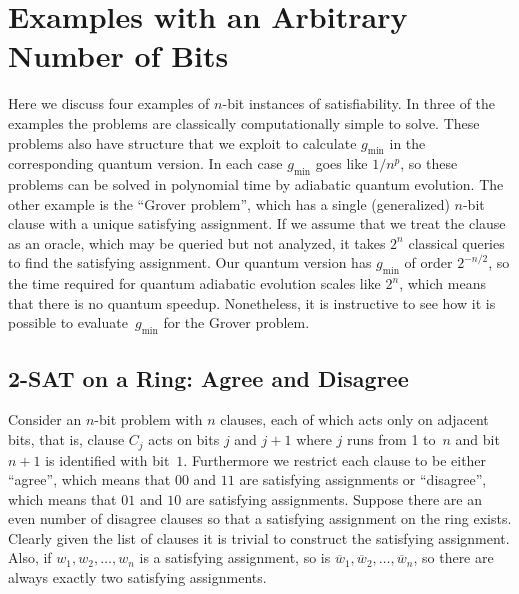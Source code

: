 \documentclass[twoside]{article}
\newcommand{\citeRef}[1]{\thinspace\cite{ref:#1}}
\newcommand{\gm}{g_{\min}}
\let\bar\overline
\numberwithin{equation}{section}
\begin{document}
\section{Examples with an Arbitrary Number of Bits}\label{sec:3}
\setcounter{equation}{0}

Here we discuss four examples  of $n$-bit instances of satisfiability. In three
of the examples the problems are classically computationally simple to solve.
These problems also have  structure that we exploit to calculate $\gm$ in
the corresponding quantum version. In each case $\gm$ goes like $1/n^p$,
so these problems can be solved in polynomial time by adiabatic quantum
evolution. The other example is the ``Grover problem''\citeRef1, which has a
single (generalized)
$n$-bit clause with a unique satisfying assignment. If we assume that we
treat the clause as an oracle, which may be queried but not analyzed, it
takes $2^n$ classical queries to find the satisfying assignment. Our
quantum version has $\gm$ of order $2^{-n/2}$, so the time required for
quantum adiabatic evolution scales like $2^n$, which means that there is
no quantum speedup.  Nonetheless, it is instructive to see how it is possible
to evaluate~$\gm$ for the Grover problem.  

\subsection{2-SAT on a Ring: Agree and Disagree}\label{sec:3.1}
\label{sec:ring} Consider an $n$-bit problem with $n$ clauses, each of
which acts only on adjacent bits,  that is, clause $C_j$ acts on bits $j$ and
$j+1$ where $j$ runs from 1 to~$n$ and bit $n+1$ is identified with
bit~$1$.  Furthermore we restrict each clause to be either ``agree'',  which
means that $00$ and $11$ are satisfying assignments or ``disagree'', which
means that
$01$ and $10$ are satisfying assignments. Suppose there are an even
number of disagree clauses so that a satisfying assignment on the ring
exists. Clearly given the list of clauses it is trivial to construct the satisfying
assignment.   Also, if
$w_1, w_2, \dots, w_n$ is a satisfying assignment, so is $\bar w_1,\bar 
w_2,
\dots,\bar  w_n$, so there are always exactly two satisfying assignments.
\end{document}
